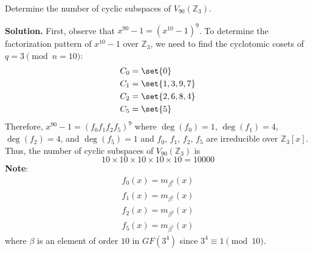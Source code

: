 \begin{Example}{}{}
    Determine the number of cyclic subspaces of $ V_{90}(\mathbb{Z}_3) $.

    \textbf{Solution.} First, observe that $ x^{90}-1=(x^{10}-1)^9 $.
    To determine the factorization pattern of $ x^{10}-1 $
    over $ \mathbb{Z}_3 $, we need to find the cyclotomic cosets
    of $ q=3\pmod{n=10} $:
    \begin{align*}
        C_0 & =\set{0}       \\
        C_1 & =\set{1,3,9,7} \\
        C_2 & =\set{2,6,8,4} \\
        C_5 & =\set{5}
    \end{align*}
    Therefore, $ x^{90}-1=(f_0f_1f_2f_5)^9 $ where
    $ \deg(f_0)=1 $, $ \deg(f_1)=4 $, $ \deg(f_2)=4 $, and $ \deg(f_5)=1 $
    and $ f_0,\,f_1,\,f_2,\,f_5 $ are irreducible over $ \mathbb{Z}_3[x] $.
    Thus, the number of cyclic subspaces of $ V_{90}(\mathbb{Z}_3) $
    is
    \[ 10\times 10\times 10\times 10\times 10=10 000 \]
    \textbf{Note}:
    \begin{align*}
        f_0(x)=m_{\beta^0}(x) \\
        f_1(x)=m_{\beta^1}(x) \\
        f_2(x)=m_{\beta^2}(x) \\
        f_5(x)=m_{\beta^5}(x)
    \end{align*}
    where $ \beta $ is an element of order $ 10 $ in $ GF(3^4) $
    since $ 3^4\equiv 1\pmod{10} $.
\end{Example}

